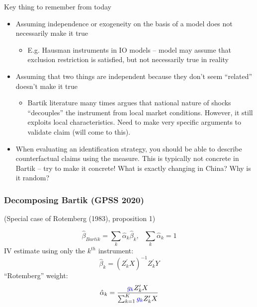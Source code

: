 \documentclass[notes,11pt, aspectratio=169]{beamer}
\begin{document}
\begin{frame}{Key thing to remember from today}
  \begin{itemize}
  \item Assuming independence or exogeneity on the basis of a model
    does not necessarily make it true
    \begin{itemize}
    \item E.g. Hausman instruments in IO models -- model may assume
      that exclusion restriction is satisfied, but not necessarily
      true in reality
    \end{itemize}
  \item Assuming that two things are independent because they don't
    seem ``related'' doesn't make it true 
    \begin{itemize}
    \item Bartik literature many times argues that national nature of
      shocks ``decouples'' the instrument from local market
      conditions. However, it still exploits local
      characteristics. Need to make very specific arguments to
      validate claim (will come to this).
    \end{itemize}
  \item When evaluating an identification strategy, you should be able
    to describe counterfactual claims using the measure. This is
    typically not concrete in Bartik -- try to make it concrete!
    What is exactly changing in China? Why is it random? 
  \end{itemize}
\end{frame}







\begin{frame}[label=rotemberg]
\frametitle{Decomposing Bartik (GPSS 2020)}
\begin{center}
(Special case of Rotemberg (1983), proposition 1)
\end{center}
\vspace{0.2in}




$$\hat{\beta}_{Bartik} =\sum_k  \hat{\alpha}_k \hat{\beta}_k , \text{      } \sum_k \hat{\alpha}_k=1$$   
IV estimate using only the $k^{th}$ instrument:
$$\hat{\beta}_k = (Z_k^\prime X)^{-1} Z_k^\prime Y$$
``Rotemberg'' weight:
$$ \hat{\alpha}_k = \frac{ \textcolor{blue}{g_k} Z_k^\prime X}{\sum_{k=1}^K \textcolor{blue}{g_k} Z_k^\prime X}$$



\hyperlink{rotproof}{}

\end{frame}
\end{document}
